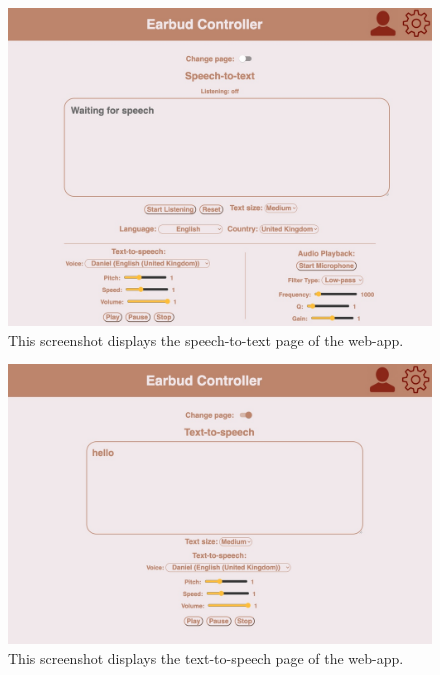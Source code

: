 \documentclass{l4proj}
\begin{document}
\begin{figure}
    \centering
    \includegraphics[width=0.85\linewidth]{dissertation/images/captions.jpeg}   
    \caption{This screenshot displays the speech-to-text page of the web-app.}
    \label{fig:captions} 
\end{figure}

\begin{figure}
    \centering
    \includegraphics[width=0.85\linewidth]{dissertation/images/text-page.jpeg}   
    \caption{This screenshot displays the text-to-speech page of the web-app.}
    \label{fig:text-page} 
\end{figure}
\end{document}
